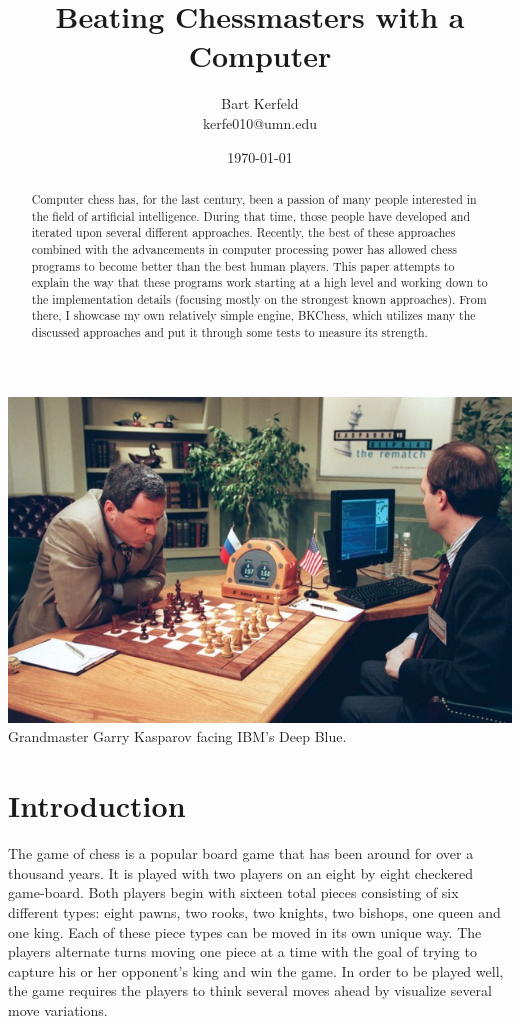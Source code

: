 \documentclass[11pt]{article}
\title{Beating Chessmasters with a Computer}
\author{
Bart Kerfeld\\kerfe010@umn.edu
}
\date{\today}
\begin{document}
\lstset{xleftmargin=\parindent}
\maketitle

\begin{abstract}
Computer chess has, for the last century, been a passion of many people interested in the field of artificial intelligence. During that time, those people have developed and iterated upon several different approaches. Recently, the best of these approaches combined with the advancements in computer processing power has allowed chess programs to become better than the best human players. This paper attempts to explain the way that these programs work starting at a high level and working down to the implementation details (focusing mostly on the strongest known approaches). From there, I showcase my own relatively simple engine, BKChess, which utilizes many the discussed approaches and put it through some tests to measure its strength. 
\end{abstract}

\vspace{1cm}

\begin{center}
\includegraphics[scale=0.55]{kasparov-vs-ibm-deep-blue-640x414.jpg}
\linebreak
Grandmaster Garry Kasparov facing IBM's Deep Blue\cite{anthony_2014}.
\end{center}

\clearpage

\section{Introduction}
The game of chess is a popular board game that has been around for over a thousand years. It is played with two players on an eight by eight checkered game-board. Both players begin with sixteen total pieces consisting of six different types: eight pawns, two rooks, two knights, two bishops, one queen and one king. Each of these piece types can be moved in its own unique way. The players alternate turns moving one piece at a time with the goal of trying to capture his or her opponent's king and win the game. In order to be played well, the game requires the players to think several moves ahead by visualize several move variations. 
\end{document}
